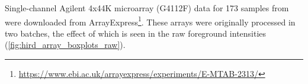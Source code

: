 %
Single-channel Agilent 4x44K microarray (G4112F) data for 173 samples from \autocite{sobolev2016AdjuvantedInfluenzaH1N1Vaccination} were downloaded from ArrayExpress\footnote{\url{https://www.ebi.ac.uk/arrayexpress/experiments/E-MTAB-2313/}}.
These arrays were originally processed in two batches, the effect of which is seen in the raw foreground intensities (\cref{fig:hird_array_boxplots_raw}).


